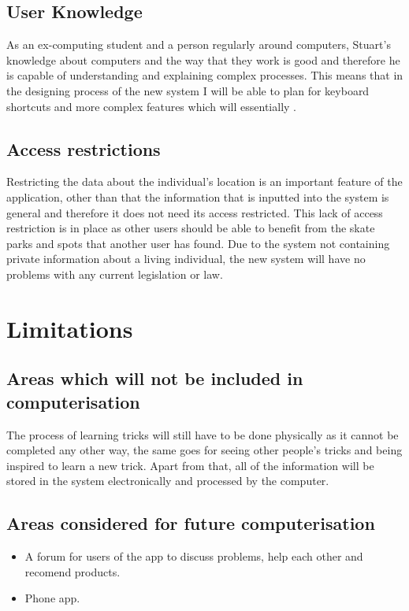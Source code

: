 {{{\subsection{User Knowledge}

As an ex-computing student and a person regularly around computers, Stuart's knowledge about computers and the way that they work is good and therefore he is capable of understanding and explaining complex processes. This means that in the designing process of the new system I will be able to plan for keyboard shortcuts and more complex features which will essentially .  

\subsection{Access restrictions}

Restricting the data about the individual's location is an important feature of the application, other than that the information that is inputted into the system is general and therefore it does not need its access restricted. This lack of access restriction is in place as other users should be able to benefit from the skate parks and spots that another user has found. Due to the system not containing private information about a living individual, the new system will have no problems with any current legislation or law. 

\section{Limitations}

\subsection{Areas which will not be included in computerisation}

The process of learning tricks will still have to be done physically as it cannot be completed any other way, the same goes for seeing other people's tricks and being inspired to learn a new trick. Apart from that, all of the information will be stored in the system electronically and processed by the computer. 

\subsection{Areas considered for future computerisation}
\begin{itemize}
\item A forum for users of the app to discuss problems, help each other and recomend products.
\item Phone app.


\end{itemize}}}}
